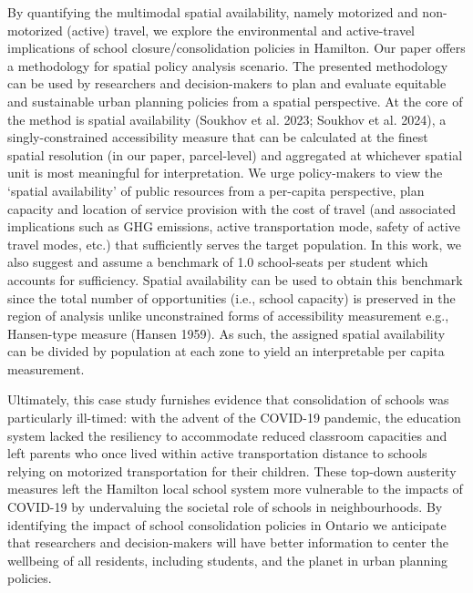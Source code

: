 \documentclass[
default
]{sn-jnl}
\begin{document}
By quantifying the multimodal spatial availability, namely motorized and
non-motorized (active) travel, we explore the environmental and
active-travel implications of school closure/consolidation policies in
Hamilton. Our paper offers a methodology for spatial policy analysis
scenario. The presented methodology can be used by researchers and
decision-makers to plan and evaluate equitable and sustainable urban
planning policies from a spatial perspective. At the core of the method
is spatial availability (Soukhov et al. 2023; Soukhov et al. 2024), a
singly-constrained accessibility measure that can be calculated at the
finest spatial resolution (in our paper, parcel-level) and aggregated at
whichever spatial unit is most meaningful for interpretation. We urge
policy-makers to view the `spatial availability' of public resources
from a per-capita perspective, plan capacity and location of service
provision with the cost of travel (and associated implications such as
GHG emissions, active transportation mode, safety of active travel
modes, etc.) that sufficiently serves the target population. In this
work, we also suggest and assume a benchmark of 1.0 school-seats per
student which accounts for sufficiency. Spatial availability can be used
to obtain this benchmark since the total number of opportunities (i.e.,
school capacity) is preserved in the region of analysis unlike
unconstrained forms of accessibility measurement e.g., Hansen-type
measure (Hansen 1959). As such, the assigned spatial availability can be
divided by population at each zone to yield an interpretable per capita
measurement.

Ultimately, this case study furnishes evidence that consolidation of
schools was particularly ill-timed: with the advent of the COVID-19
pandemic, the education system lacked the resiliency to accommodate
reduced classroom capacities and left parents who once lived within
active transportation distance to schools relying on motorized
transportation for their children. These top-down austerity measures
left the Hamilton local school system more vulnerable to the impacts of
COVID-19 by undervaluing the societal role of schools in neighbourhoods.
By identifying the impact of school consolidation policies in Ontario we
anticipate that researchers and decision-makers will have better
information to center the wellbeing of all residents, including
students, and the planet in urban planning policies.
\end{document}
